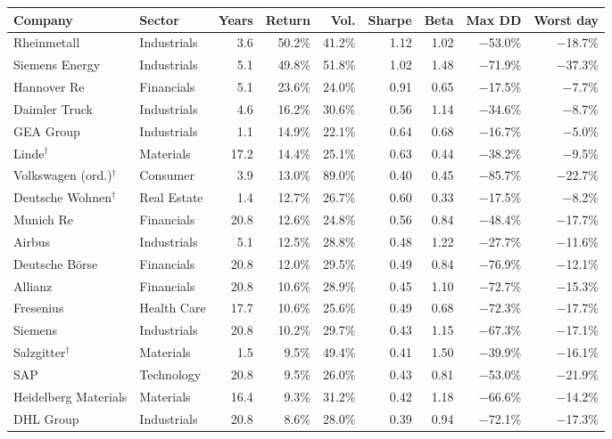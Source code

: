 \begin{longtable}{llrrrrrrr}
\toprule
Company & Sector & Years & Return & Vol. & Sharpe & Beta & Max DD & Worst day \\
\midrule
\endhead
\bottomrule
\endfoot
Rheinmetall & Industrials & 3.6 & 50.2\% & 41.2\% & 1.12 & 1.02 & $-$53.0\% & $-$18.7\% \\
Siemens Energy & Industrials & 5.1 & 49.8\% & 51.8\% & 1.02 & 1.48 & $-$71.9\% & $-$37.3\% \\
Hannover Re & Financials & 5.1 & 23.6\% & 24.0\% & 0.91 & 0.65 & $-$17.5\% & $-$7.7\% \\
Daimler Truck & Industrials & 4.6 & 16.2\% & 30.6\% & 0.56 & 1.14 & $-$34.6\% & $-$8.7\% \\
GEA Group & Industrials & 1.1 & 14.9\% & 22.1\% & 0.64 & 0.68 & $-$16.7\% & $-$5.0\% \\
Linde$^{\dagger}$ & Materials & 17.2 & 14.4\% & 25.1\% & 0.63 & 0.44 & $-$38.2\% & $-$9.5\% \\
Volkswagen (ord.)$^{\dagger}$ & Consumer & 3.9 & 13.0\% & 89.0\% & 0.40 & 0.45 & $-$85.7\% & $-$22.7\% \\
Deutsche Wohnen$^{\dagger}$ & Real Estate & 1.4 & 12.7\% & 26.7\% & 0.60 & 0.33 & $-$17.5\% & $-$8.2\% \\
Munich Re & Financials & 20.8 & 12.6\% & 24.8\% & 0.56 & 0.84 & $-$48.4\% & $-$17.7\% \\
Airbus & Industrials & 5.1 & 12.5\% & 28.8\% & 0.48 & 1.22 & $-$27.7\% & $-$11.6\% \\
Deutsche Börse & Financials & 20.8 & 12.0\% & 29.5\% & 0.49 & 0.84 & $-$76.9\% & $-$12.1\% \\
Allianz & Financials & 20.8 & 10.6\% & 28.9\% & 0.45 & 1.10 & $-$72.7\% & $-$15.3\% \\
Fresenius & Health Care & 17.7 & 10.6\% & 25.6\% & 0.49 & 0.68 & $-$72.3\% & $-$17.7\% \\
Siemens & Industrials & 20.8 & 10.2\% & 29.7\% & 0.43 & 1.15 & $-$67.3\% & $-$17.1\% \\
Salzgitter$^{\dagger}$ & Materials & 1.5 & 9.5\% & 49.4\% & 0.41 & 1.50 & $-$39.9\% & $-$16.1\% \\
SAP & Technology & 20.8 & 9.5\% & 26.0\% & 0.43 & 0.81 & $-$53.0\% & $-$21.9\% \\
Heidelberg Materials & Materials & 16.4 & 9.3\% & 31.2\% & 0.42 & 1.18 & $-$66.6\% & $-$14.2\% \\
DHL Group & Industrials & 20.8 & 8.6\% & 28.0\% & 0.39 & 0.94 & $-$72.1\% & $-$17.3\% \\

\end{longtable}
